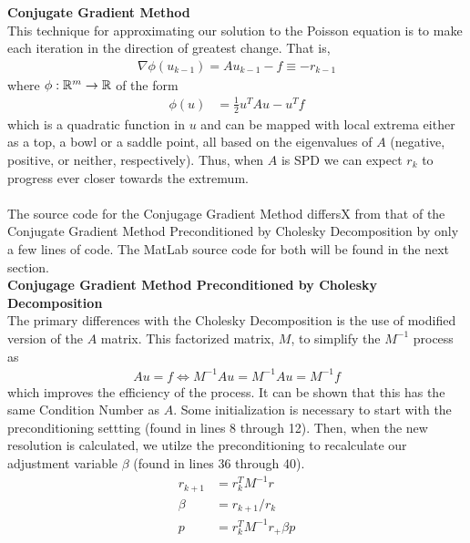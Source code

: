 \documentclass[12pt,a4paper]{report}
\begin{document}


\noindent\textbf{Conjugate Gradient Method}\\

This technique for approximating our solution to the Poisson equation is to make each iteration in the direction of greatest change.  That is, 
\begin{align*}
	\nabla \phi(u_{k-1}) = Au_{k-1}-f \equiv -r_{k-1}
\end{align*}where $\phi: \mathbb{R}^m \to \mathbb{R}$ of the form
\begin{align*}
	\phi(u) &= \frac{1}{2}u^TAu-u^Tf
\end{align*}which is a quadratic function in $u$ and can be mapped with local extrema either as a top, a bowl or a saddle point, all based on the eigenvalues of $A$ (negative, positive, or neither, respectively).  Thus, when $A$ is SPD we can expect $r_{k}$ to progress ever closer towards the extremum. \\
\\The source code for the Conjugage Gradient Method differsX from that of the Conjugate Gradient Method Preconditioned by Cholesky Decomposition by only a few lines of code.  The MatLab source code for both will be found in the next section. \\

%	




\noindent\textbf{Conjugage Gradient Method Preconditioned by Cholesky Decomposition}\\

The primary differences with the Cholesky Decomposition is the use of modified version of the $A$ matrix.  This factorized matrix, $M$, to simplify the $M^{-1}$ process as
\begin{align*}
	Au =f \iff M^{-1}Au = M^{-1}Au= M^{-1}f
\end{align*}which improves the efficiency of the process.  It can be shown that this has the same Condition Number as $A$. Some initialization is necessary to start with the preconditioning settting (found in lines 8 through 12). Then, when the new resolution is calculated, we utilze the preconditioning to recalculate our adjustment variable $\beta$ (found in lines 36 through 40).
\begin{align*}
	r_{k+1} &= r_k^T M^{-1}r \\
	\beta &= r_{k+1}/r_k \\
	p &= r_k^TM^{-1}r _+ \beta p
\end{align*}
\end{document}
